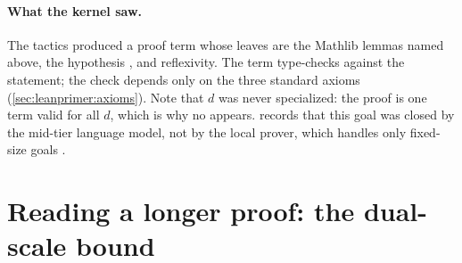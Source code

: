 \paragraph{What the kernel saw.} The tactics produced a proof term whose leaves are the
Mathlib lemmas named above, the hypothesis , and reflexivity. The term type-checks
against the statement; the check depends only on the three standard axioms
(\cref{sec:leanprimer:axioms}). Note that $d$ was never specialized: the proof is one term
valid for all $d$, which is why no  appears.  records
that this goal was closed by the mid-tier language model, not by the local prover, which
handles only fixed-size goals .

\section{Reading a longer proof: the dual-scale bound}\label{sec:leanprimer:longproof}

